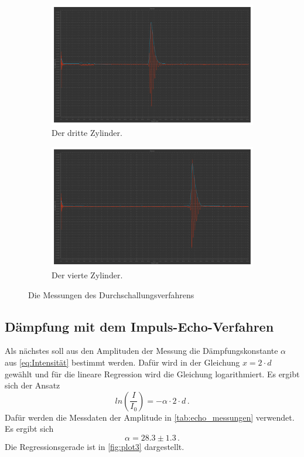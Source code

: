 \begin{figure}
  \begin{subfigure}{0.48\textwidth}%
  \centering%
  \includegraphics[width=\linewidth]{pictures/Durchschallung/z3.pdf}%
  \caption{Der dritte Zylinder.}%
  \label{fig:durchschallung_z3}%
  \end{subfigure}%
  \hfill%
  \begin{subfigure}{0.48\textwidth}%
  \centering%
  \includegraphics[width=\linewidth]{pictures/Durchschallung/z4.pdf}%
  \caption{Der vierte Zylinder.}%
  \label{fig:durchschallung_z4}%
  \end{subfigure}%
  \hfill
  \caption{Die Messungen des Durchschallungsverfahrens}%
  \label{fig:durchschallung_messungen}%
\end{figure}%

\subsection{Dämpfung mit dem Impuls-Echo-Verfahren}
Als nächstes soll aus den Amplituden der Messung die Dämpfungskonstante $\alpha$ aus \autoref{eq:Intensität} bestimmt werden.
Dafür wird in der Gleichung $x = 2 \cdot d$ gewählt und für die lineare Regression wird die Gleichung logarithmiert.
Es ergibt sich der Ansatz
\begin{equation*}
  ln \left( \frac{I}{I_0} \right) = - \alpha \cdot 2 \cdot d \, .
\end{equation*}
Dafür werden die Messdaten der Amplitude in \autoref{tab:echo_messungen} verwendet.
Es ergibt sich
\begin{equation*}
  \alpha = 28.3 \pm 1.3 \, .
\end{equation*}
Die Regressionsgerade ist in \autoref{fig:plot3} dargestellt.

